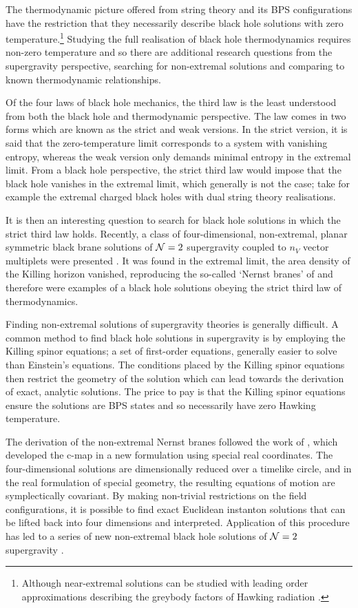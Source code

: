 The thermodynamic picture offered from string theory and its BPS configurations have the restriction that they necessarily describe black hole solutions with zero temperature.\footnote{Although near-extremal solutions can be studied with leading order approximations describing the greybody factors of Hawking radiation \cite{Maldacena:1996ix, Gubser:1998ex}.} Studying the full realisation of black hole thermodynamics requires non-zero temperature and so there are additional research questions from the supergravity perspective, searching for non-extremal solutions and comparing to known thermodynamic relationships. 

Of the four laws of black hole mechanics, the third law is the least understood from both the black hole and thermodynamic perspective. The law comes in two forms which are known as the strict and weak versions. In the strict version, it is said that the zero-temperature limit corresponds to a system with vanishing entropy, whereas the weak version only demands minimal entropy in the extremal limit. From a black hole perspective, the strict third law would impose that the black hole vanishes in the extremal limit, which generally is not the case; take for example the extremal charged black holes with dual string theory realisations. 

It is then an interesting question to search for black hole solutions in which the strict third law holds. Recently, a class of four-dimensional, non-extremal, planar symmetric black brane solutions of ${\cal N} = 2$ supergravity coupled to $n_V$ vector multiplets were presented \cite{Dempster:2015}. It was found in the extremal limit, the area density of the Killing horizon vanished, reproducing the so-called `Nernst branes' of \cite{Barisch:2011ui, Cardoso:2015wcf} and therefore were examples of a black hole solutions obeying the strict third law of thermodynamics.

Finding non-extremal solutions of supergravity theories is generally difficult. A common method to find black hole solutions in supergravity is by employing the Killing spinor equations; a set of first-order equations, generally easier to solve than Einstein's equations. The conditions placed by the Killing spinor equations then restrict the geometry of the solution which can lead towards the derivation of exact, analytic solutions. The price to pay is that the Killing spinor equations ensure the solutions are BPS states and so necessarily have zero Hawking temperature. 

The derivation of the non-extremal Nernst branes followed the work of \cite{Mohaupt:2011aa, Cortes:2015wca}, which developed the c-map in a new formulation using special real coordinates. The four-dimensional solutions are dimensionally reduced over a timelike circle, and in the real formulation of special geometry, the resulting equations of motion are symplectically covariant. By making non-trivial restrictions on the field configurations, it is possible to find exact Euclidean instanton solutions that can be lifted back into four dimensions and interpreted. Application of this procedure has led to a series of new non-extremal black hole solutions of ${\cal N} = 2$ supergravity \cite{Mohaupt:2011aa, Errington:2014bta, Dempster:2015, Dempster:2016}.

